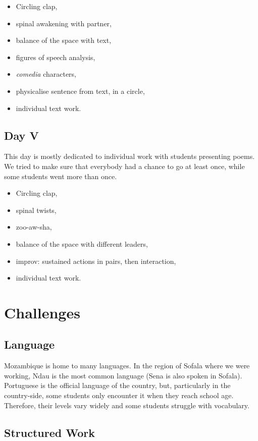 \documentclass[article,twocolumn,twoside]{memoir}
\begin{document}
\begin{itemize}
\item Circling clap,
\item spinal awakening with partner,
\item balance of the space with text,
\item figures of speech analysis,
\item \textit{comedia} characters,
\item physicalise sentence from text, in a circle,
\item individual text work.
\end{itemize}
\section{Day V}

This day is mostly dedicated to individual work with students presenting poems.
We tried to make sure that everybody had a chance to go at least once, while
some students went more than once.

\begin{itemize}
\item Circling clap,
\item spinal twists,
\item zoo-aw-sha,
\item balance of the space with different leaders,
\item improv: sustained actions in pairs, then interaction,
\item individual text work.
\end{itemize}

\chapter{Challenges}
\section{Language}

Mozambique is home to many languages. In the region of Sofala where we were
working, Ndau is the most common language (Sena is also spoken in Sofala).
Portuguese is the official language of the country, but, particularly in the
country-side, some students only encounter it when they reach school age.
Therefore, their levels vary widely and some students struggle with vocabulary.

\section{Structured Work}
\end{document}
